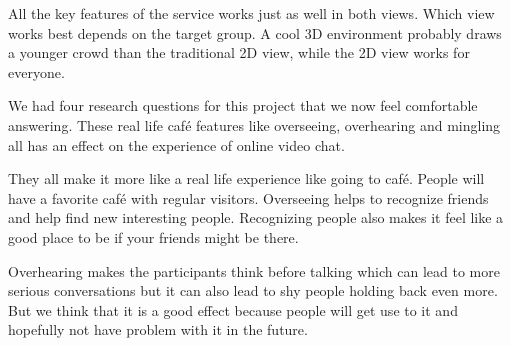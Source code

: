 \documentclass[12pt, titlepage]{article}
\begin{document}
All the key features of the service works just as well in both views. Which view works best depends on the target group. A cool 3D environment probably draws a younger crowd than the traditional 2D view, while the 2D view works for everyone.

We had four research questions for this project that we now feel comfortable answering. These real life café features like overseeing, overhearing and mingling all has an effect on the experience of online video chat.

They all make it more like a real life experience like going to café. People will have a favorite café with regular visitors. Overseeing helps to recognize friends and help find new interesting people. Recognizing people also makes it feel like a good place to be if your friends might be there.

Overhearing makes the participants think before talking which can lead to more serious conversations but it can also lead to shy people holding back even more. But we think that it is a good effect because people will get use to it and hopefully not have problem with it in the future.
\end{document}
